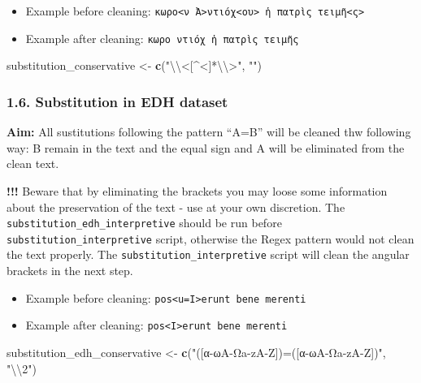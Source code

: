 \documentclass[]{article}
\newenvironment{Shaded}{\begin{snugshade}}{\end{snugshade}}
\newcommand{\CharTok}[1]{\textcolor[rgb]{0.31,0.60,0.02}{#1}}
\newcommand{\KeywordTok}[1]{\textcolor[rgb]{0.13,0.29,0.53}{\textbf{#1}}}
\newcommand{\NormalTok}[1]{#1}
\newcommand{\StringTok}[1]{\textcolor[rgb]{0.31,0.60,0.02}{#1}}
\providecommand{\tightlist}{%
  \setlength{\itemsep}{0pt}\setlength{\parskip}{0pt}}
\begin{document}
\begin{itemize}
\tightlist
\item
  Example before cleaning:
  \texttt{κωρο\textless{}ν\ Ἀ\textgreater{}ντιόχ\textless{}ου\textgreater{}\ ἡ\ πατρὶς\ τειμῆ\textless{}ς\textgreater{}}
\item
  Example after cleaning: \texttt{κωρο\ ντιόχ\ ἡ\ πατρὶς\ τειμῆς}
\end{itemize}

\begin{Shaded}
\begin{Highlighting}[]
\NormalTok{substitution_conservative <-}\StringTok{ }\KeywordTok{c}\NormalTok{(}\StringTok{"}\CharTok{\textbackslash{}\textbackslash{}}\StringTok{<[^<]*}\CharTok{\textbackslash{}\textbackslash{}}\StringTok{>"}\NormalTok{, }\StringTok{""}\NormalTok{)}
\end{Highlighting}
\end{Shaded}

\hypertarget{substitution-in-edh-dataset}{%
\subsubsection{1.6. Substitution in EDH
dataset}\label{substitution-in-edh-dataset}}

\textbf{Aim:} All sustitutions following the pattern ``A=B'' will be
cleaned thw following way: B remain in the text and the equal sign and A
will be eliminated from the clean text.

\textbf{!!!} Beware that by eliminating the brackets you may loose some
information about the preservation of the text - use at your own
discretion. The \texttt{substitution\_edh\_interpretive} should be run
before \texttt{substitution\_interpretive} script, otherwise the Regex
pattern would not clean the text properly. The
\texttt{substitution\_interpretive} script will clean the angular
brackets in the next step.

\begin{itemize}
\tightlist
\item
  Example before cleaning:
  \texttt{pos\textless{}u=I\textgreater{}erunt\ bene\ merenti}
\item
  Example after cleaning:
  \texttt{pos\textless{}I\textgreater{}erunt\ bene\ merenti}
\end{itemize}

\begin{Shaded}
\begin{Highlighting}[]
\NormalTok{substitution_edh_conservative <-}\StringTok{ }\KeywordTok{c}\NormalTok{(}\StringTok{"([α-ωΑ-Ωa-zA-Z])=([α-ωΑ-Ωa-zA-Z])"}\NormalTok{, }\StringTok{"}\CharTok{\textbackslash{}\textbackslash{}}\StringTok{2"}\NormalTok{)}
\end{Highlighting}
\end{Shaded}
\end{document}

